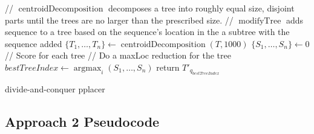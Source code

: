\documentclass[10pt]{article}
\begin{document}
\begin{algorithm}[H]
\SetAlgoLined
{}
 // $\operatorname{centroidDecomposition}$ decomposes a tree into roughly equal size, disjoint parts until the trees are no larger than the prescribed size.\;
 // $\operatorname{modifyTree}$ adds sequence to a tree based on the sequence's location in the a subtree with the sequence added\;
 $\{T_1,\dots,T_n\} \leftarrow \operatorname{centroidDecomposition}(T,1000)$\;
 $\{S_1, \dots, S_n\} \leftarrow 0$ // Score for each tree\;
 // Do a maxLoc reduction for the tree\;
 $bestTreeIndex \leftarrow \operatorname{argmax}_{i} (S_1,\dots,S_n)$\;
 return $T'_{q_{bestTreeIndex}}$\;
 \caption{divide-and-conquer pplacer}
 \label{alg:approach1}
\end{algorithm}

\subsection{Approach 2 Pseudocode}
\end{document}
